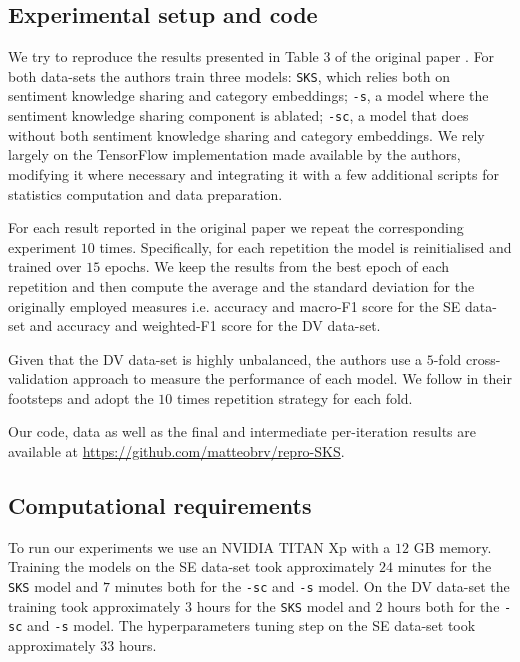 \subsection{Experimental setup and code}
We try to reproduce the results presented in Table $3$ of the original paper \cite{original_zhou}. For both data-sets the authors train three models: \texttt{SKS}, which relies both on sentiment knowledge sharing and category embeddings; \texttt{-s}, a model where the sentiment knowledge sharing component is ablated; \texttt{-sc}, a model that does without both sentiment knowledge sharing and category embeddings. We rely largely on the TensorFlow implementation \cite{tensorflow2015} made available by the authors, modifying it where necessary and integrating it with a few additional scripts for statistics computation and data preparation.

For each result reported in the original paper we repeat the corresponding experiment $10$ times. Specifically, for each repetition the model is reinitialised and trained over $15$ epochs. We keep the results from the best epoch of each repetition and then compute the average and the standard deviation for the originally employed measures i.e. accuracy and macro-F1 score for the SE data-set and accuracy and weighted-F1 score for the DV data-set.

Given that the DV data-set is highly unbalanced, the authors use a $5$-fold cross-validation approach to measure the performance of each model. We follow in their footsteps and adopt the $10$ times repetition strategy for each fold.

Our code, data as well as the final and intermediate per-iteration results are available at 
\url{https://github.com/matteobrv/repro-SKS}.


\subsection{Computational requirements}
To run our experiments we use an NVIDIA TITAN Xp with a $12$ GB memory. Training the models on the SE data-set took approximately $24$ minutes for the \texttt{SKS} model and $7$ minutes both for the \texttt{-sc} and \texttt{-s} model.
On the DV data-set the training took approximately $3$ hours for the \texttt{SKS} model and $2$ hours both for the \texttt{-sc} and \texttt{-s} model. The hyperparameters tuning step on the SE data-set took approximately $33$ hours.
 


